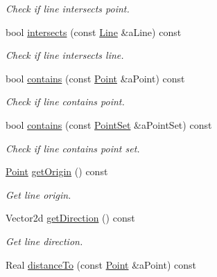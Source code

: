 \begin{DoxyCompactItemize}
\begin{DoxyCompactList}\small\item\em Check if line intersects point. \end{DoxyCompactList}\item 
bool \hyperlink{classostk_1_1math_1_1geom_1_1d2_1_1objects_1_1_line_af5918581cbbe8fdd5443bffbbffa5c41}{intersects} (const \hyperlink{classostk_1_1math_1_1geom_1_1d2_1_1objects_1_1_line}{Line} \&a\+Line) const
\begin{DoxyCompactList}\small\item\em Check if line intersects line. \end{DoxyCompactList}\item 
bool \hyperlink{classostk_1_1math_1_1geom_1_1d2_1_1objects_1_1_line_aa9569b2e970849c47009a53b1e22dfdb}{contains} (const \hyperlink{classostk_1_1math_1_1geom_1_1d2_1_1objects_1_1_point}{Point} \&a\+Point) const
\begin{DoxyCompactList}\small\item\em Check if line contains point. \end{DoxyCompactList}\item 
bool \hyperlink{classostk_1_1math_1_1geom_1_1d2_1_1objects_1_1_line_a15a8242575d3a68ddb53640a4c25a48d}{contains} (const \hyperlink{classostk_1_1math_1_1geom_1_1d2_1_1objects_1_1_point_set}{Point\+Set} \&a\+Point\+Set) const
\begin{DoxyCompactList}\small\item\em Check if line contains point set. \end{DoxyCompactList}\item 
\hyperlink{classostk_1_1math_1_1geom_1_1d2_1_1objects_1_1_point}{Point} \hyperlink{classostk_1_1math_1_1geom_1_1d2_1_1objects_1_1_line_aa4c99f38ff7ac4e8fcfe90d9b2bcb0b9}{get\+Origin} () const
\begin{DoxyCompactList}\small\item\em Get line origin. \end{DoxyCompactList}\item 
Vector2d \hyperlink{classostk_1_1math_1_1geom_1_1d2_1_1objects_1_1_line_aaf4b3ec34652358d298315ea1c8072a7}{get\+Direction} () const
\begin{DoxyCompactList}\small\item\em Get line direction. \end{DoxyCompactList}\item 
Real \hyperlink{classostk_1_1math_1_1geom_1_1d2_1_1objects_1_1_line_a70baa8b6dcab704385e54c4086343d57}{distance\+To} (const \hyperlink{classostk_1_1math_1_1geom_1_1d2_1_1objects_1_1_point}{Point} \&a\+Point) const

\end{DoxyCompactItemize}
